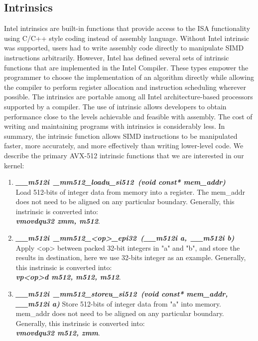 \documentclass[sigconf]{acmart}
\begin{document}
\subsection{Intrinsics}
Intel intrinsics are built-in functions that provide access to the ISA functionality
using C/C++ style coding instead of assembly language. Without Intel intrinsic was
supported, users had to write assembly code directly to manipulate SIMD
instructions arbitrarily.
However, Intel has defined several sets of intrinsic functions that are implemented
in the Intel Compiler. These types empower the programmer to choose the implementation
of an algorithm directly while allowing the compiler to perform register allocation
and instruction scheduling wherever possible. The intrinsics are portable among all
Intel architecture-based processors supported by a compiler. The use of intrinsic
allows developers to obtain performance close to the levels achievable and feasible with assembly.
The cost of writing and maintaining programs with intrinsics is considerably less.
In summary, the intrinsic function allows SIMD instructions to be manipulated faster, more
accurately, and more effectively than writing lower-level code.
We describe the primary AVX-512 intrinsic functions that we are interested in our kernel:

\begin{enumerate}[leftmargin=*]
  \item \emph{\textbf{\textit{\_\_m512i\ \_mm512\_loadu\_si512\ (void const* mem\_addr)}}} \\
  Load 512-bits of integer data from memory into a register. The mem\_addr does not need to be aligned on any particular boundary.
  Generally, this instrinsic is converted into:\\
  \emph{\textbf{\textit{vmovdqu32  zmm,  m512}}}.
  \item \emph{\textbf{\textit{\_\_m512i\ \_mm512\_<op>\_epi32\ (\_\_m512i a,\ \_\_m512i b)}}}
  Apply <op> between packed 32-bit integers in "a" and "b", and store the results in destination, here we use 32-bits integer as an example.
  Generally, this instrinsic is converted into:\\
  \emph{\textbf{\textit{vp<op>d  m512,  m512,  m512}}}.
  \item \emph{\textbf{\textit{\_\_m512i\ \_mm512\_storeu\_si512\ (void const* mem\_addr,\\ \_\_m512i a)}}}
  Store 512-bits of integer data from "a" into memory. mem\_addr does not need to be aligned on any particular boundary.
  Generally, this instrinsic is converted into:\\
  \emph{\textbf{\textit{vmovdqu32  m512, zmm}}}.
\end{enumerate}
\end{document}
